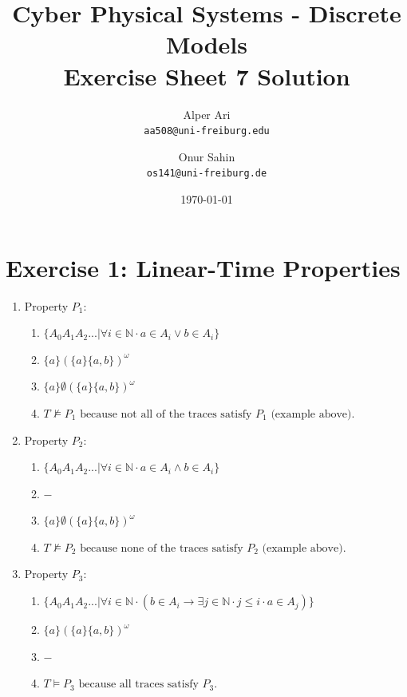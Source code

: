 \documentclass{article}
\title{
Cyber Physical Systems - Discrete Models \\
[0.2em]Exercise Sheet 7 Solution
}
\author{
  Alper Ari\\
  \texttt{aa508@uni-freiburg.edu}
  \and
  Onur Sahin\\
  \texttt{os141@uni-freiburg.de}
}
\date{\today}
\newcommand{\N}{\mathbb{N}}
\begin{document}
\maketitle

\section*{Exercise 1:  Linear-Time Properties}
\begin{enumerate}
    \item Property $P_1:$
    \begin{enumerate}[i]
        \item 
        $
            \{ A_0 A_1 A_2 ... | \forall i \in \N \cdot a\in A_i \vee b\in A_i \}
        $
        \item 
        $
            \{a\}(\{a\}\{a,b\})^\omega
        $
        \item 
        $
            \{a\} \emptyset (\{a\}\{a,b\})^\omega
        $
        \item 
        $
            T \nvDash P_1 \text{ because not all of the traces satisfy $P_1$ (example above)}.
        $
    \end{enumerate}

    \item Property $P_2:$
    \begin{enumerate}[i]
        \item 
        $
            \{ A_0 A_1 A_2 ... | \forall i \in \N \cdot a\in A_i \wedge b\in A_i \}
        $
        \item 
        $
            -
        $
        \item 
        $
            \{a\} \emptyset (\{a\}\{a,b\})^\omega
        $
        \item 
        $
            T \nvDash P_2 \text{ because none of the traces satisfy $P_2$ (example above)}.
        $
    \end{enumerate}

    \item Property $P_3:$
    \begin{enumerate}[i]
        \item 
        $
            \{ A_0 A_1 A_2 ... | \forall i \in \N \cdot (b\in A_i \longrightarrow \exists j \in \N \cdot j \leq i \cdot a \in A_j) \}
        $
        \item 
        $
            \{a\} (\{a\}\{a,b\})^\omega
        $
        \item 
        $
            -
        $
        \item 
        $
            T \vDash P_3 \text{ because all traces satisfy $P_3$}.
        $
    \end{enumerate}


\end{enumerate}
\end{document}
